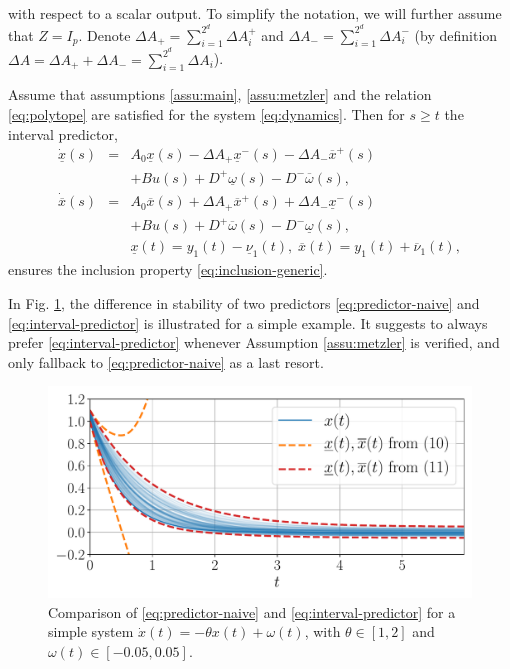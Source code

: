 \documentclass[letterpaper, 10 pt, conference]{ieeeconf}  %
\begin{document}
with respect to a scalar output. To simplify the notation, we will
further assume that $Z=I_{p}$. Denote $\Delta A_{+}=\sum_{i=1}^{2^{d}}\Delta A_{i}^{+}$
and $\Delta A_{-}=\sum_{i=1}^{2^{d}}\Delta A_{i}^{-}$ (by definition
$\Delta A=\Delta A_{+}+\Delta A_{-}=\sum_{i=1}^{2^{d}}\Delta A_{i}$).
\begin{proposition}
 \label{prop:predictor}
Assume that assumptions \ref{assu:main}, \ref{assu:metzler} and
the relation \eqref{eq:polytope} are satisfied for the system \eqref{eq:dynamics}.
Then for $s\geq t$ the interval predictor,
\begin{eqnarray}
\dot{\underline{x}}(s) & = & A_{0}\underline{x}(s)-\Delta A_{+}\underline{x}^{-}(s)-\Delta A_{-}\overline{x}^{+}(s)\nonumber \\
 &  & +Bu(s)+D^{+}\underline{\omega}(s)-D^{-}\overline{\omega}(s),\nonumber \\
\dot{\overline{x}}(s) & = & A_{0}\overline{x}(s)+\Delta A_{+}\overline{x}^{+}(s)+\Delta A_{-}\underline{x}^{-}(s)\label{eq:interval-predictor}\\
 &  & +Bu(s)+D^{+}\overline{\omega}(s)-D^{-}\underline{\omega}(s),\nonumber \\
 &  & \underline{x}(t)=y_{1}(t)-\underline{\nu}_{1}(t),\;\overline{x}(t)=y_{1}(t)+\overline{\nu}_{1}(t),\nonumber 
\end{eqnarray}
ensures the inclusion property \eqref{eq:inclusion-generic}.
\end{proposition}
In Fig. \ref{fig:predictor_example}, the difference in stability
of two predictors \eqref{eq:predictor-naive} and \eqref{eq:interval-predictor}
is illustrated for a simple example. It suggests to always prefer
\eqref{eq:interval-predictor} whenever Assumption \ref{assu:metzler}
is verified, and only fallback to \eqref{eq:predictor-naive} as a
last resort. 
\begin{figure}
\begin{centering}
\includegraphics[width=1\linewidth]{img/interval-predictor}
\par\end{centering}
\caption{\label{fig:predictor_example} Comparison of \eqref{eq:predictor-naive}
and \eqref{eq:interval-predictor} for a simple system $\dot{x}(t)=-\theta x(t)+\omega(t)$,
with $\theta\in[1,2]$ and $\omega(t)\in[-0.05,0.05]$.}
\end{figure}
\end{document}

